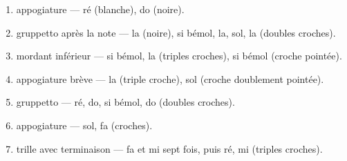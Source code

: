 \begin{enumerate}[label=\textbf{\arabic*}~:, leftmargin=2.2em, itemsep=1pt]
  \item appogiature --- ré (blanche), do (noire).
  \item gruppetto après la note --- la (noire), si bémol, la, sol, la (doubles croches).
  \item mordant inférieur --- si bémol, la (triples croches), si bémol (croche pointée).
  \item appogiature brève --- la (triple croche), sol (croche doublement pointée).
  \item gruppetto --- ré, do, si bémol, do (doubles croches).
  \item appogiature --- sol, fa (croches).
  \item trille avec terminaison --- fa et mi sept fois, puis ré, mi (triples croches).
\end{enumerate}
